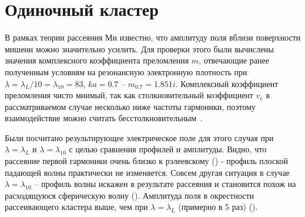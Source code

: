 \section{Одиночный кластер}

В рамках теории рассеяния Ми известно, что амплитуду поля вблизи поверхности мишени можно значительно усилить. Для проверки этого были вычислены значения комплексного коэффициента преломления $m$, отвечающие ранее полученным условиям на резонансную электронную плотность при $\lambda = \lambda_L / 10 = \lambda_{10} = 83$, $ka = 0.7$ -- $m_{0.7} = 1.851i$. Комплексный коэффициент преломления чисто мнимый, так как столкновительный коэффициент $v_e$ в рассматриваемом случае несколько ниже частоты гармоники, поэтому взаимодействие можно считать бесстолкновительным~\cite{andreev_lecz}.

Были посчитано результирующее электрическое поле для этого случая при $\lambda = \lambda_{L}$ и $\lambda = \lambda_{10}$ с целью сравнения профилей и амплитуды. Видно, что рассеяние первой гармоники очень близко к рэлеевскому () - профиль плоской падающей волны практически не изменяется. Совсем другая ситуация в случае $\lambda = \lambda_{10}$ -- профиль волны искажен в результате рассеяния и становится похож на расходящуюся сферическую волну (). Амплитуда поля в окрестности рассеивающего кластера выше, чем при $\lambda = \lambda_{L}$ (примерно в 5 раз) ().



